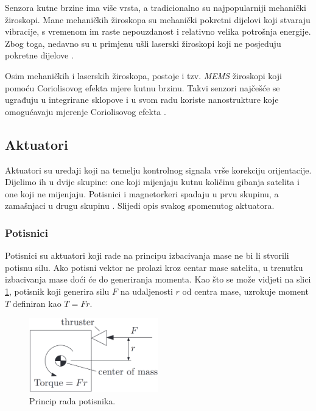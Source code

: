 \documentclass[times, utf8, diplomski, numeric]{templates/template}
\begin{document}
{{{            Senzora kutne brzine ima više vrsta, a tradicionalno su najpopularniji mehanički žiroskopi. Mane mehaničkih žiroskopa su mehanički pokretni dijelovi koji stvaraju vibracije, s vremenom im raste nepouzdanost i relativno velika potrošnja energije. Zbog toga, nedavno su u primjenu ušli laserski žiroskopi koji ne posjeduju pokretne dijelove \cite{adcsKnjiga}. 

            Osim mehaničkih i laserskih žiroskopa, postoje i tzv. \emph{MEMS} žiroskopi koji pomoću Coriolisovog efekta mjere kutnu brzinu. Takvi senzori najčešće se ugrađuju u integrirane sklopove i u svom radu koriste nanostrukture koje omogućavaju mjerenje Coriolisovog efekta \cite{memsGyro}.
        }

        \subsection{Aktuatori}{
            Aktuatori su uređaji koji na temelju kontrolnog signala vrše korekciju orijentacije. Dijelimo ih u dvije skupine: one koji mijenjaju kutnu količinu gibanja satelita i one koji ne mijenjaju. Potisnici i magnetorkeri spadaju u prvu skupinu, a zamašnjaci u drugu skupinu \cite{adcsKnjiga}. Slijedi opis svakog spomenutog aktuatora. 

            \subsubsection{Potisnici }{
                Potisnici su aktuatori koji rade na principu izbacivanja mase ne bi li stvorili potisnu silu. Ako potisni vektor ne prolazi kroz centar mase satelita, u trenutku izbacivanja mase doći će do generiranja momenta. Kao što se može vidjeti na slici \ref{fig:thruster_img}, potisnik koji generira silu $F$ na udaljenosti $r$ od centra mase, uzrokuje moment $T$ definiran kao $T=Fr$.

                \begin{figure}[htb]
                \centering
                \includegraphics[width=0.5\textwidth]{images/thruster_img.png}
                \caption{Princip rada potisnika.}
                \label{fig:thruster_img}
                \end{figure}

}}}}
\end{document}

